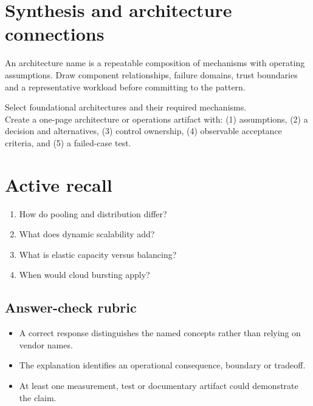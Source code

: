 \documentclass[10pt,letterpaper]{article}
\begin{document}
\section{Synthesis and architecture connections}
An architecture name is a repeatable composition of mechanisms with operating assumptions. Draw component relationships, failure domains, trust boundaries and a representative workload before committing to the pattern.
\begin{workbox}[title={Applied deliverable}]
Select foundational architectures and their required mechanisms.\\[4pt]Create a one-page architecture or operations artifact with: (1) assumptions, (2) a decision and alternatives, (3) control ownership, (4) observable acceptance criteria, and (5) a failed-case test.
\end{workbox}
\section{Active recall}
\begin{enumerate}
\item How do pooling and distribution differ?
\item What does dynamic scalability add?
\item What is elastic capacity versus balancing?
\item When would cloud bursting apply?
\end{enumerate}
\subsection{Answer-check rubric}
\begin{itemize}
\item A correct response distinguishes the named concepts rather than relying on vendor names.
\item The explanation identifies an operational consequence, boundary or tradeoff.
\item At least one measurement, test or documentary artifact could demonstrate the claim.
\end{itemize}
\end{document}
